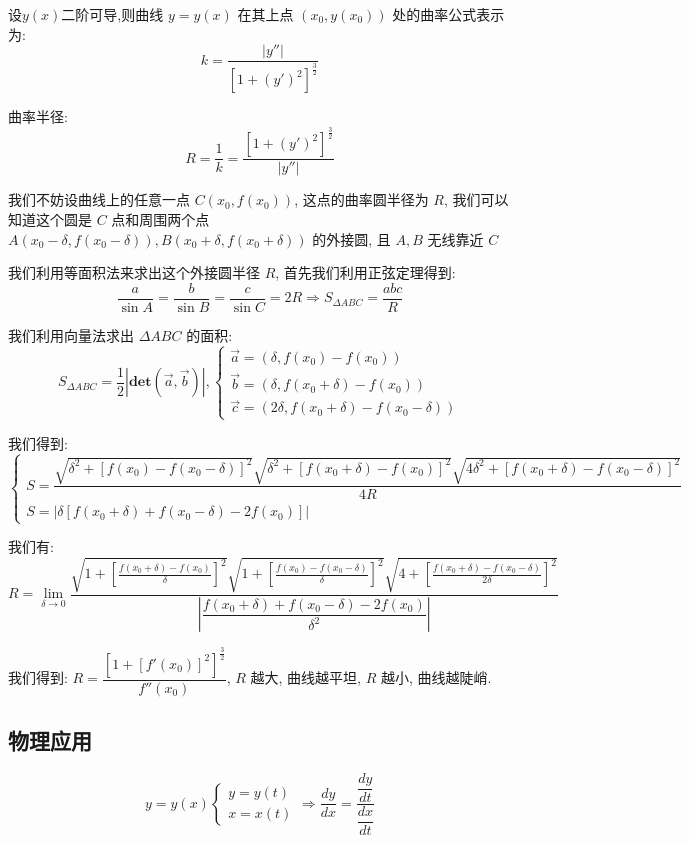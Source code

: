 \begin{definition}[曲率和曲率半径]

	设$y(x)$二阶可导,则曲线 $y=y(x)$ 在其上点 $(x_{0},y(x_{0}))$ 处的曲率公式表示为:
	$$k=\frac{|y''|}{[1+(y')^{2}]^{\frac{3}{2}}}$$

	曲率半径:
	$$R=\frac{1}{k}=\frac{[1+(y')^{2}]^{\frac{3}{2}}}{|y''|}$$
\end{definition}
\begin{anymark}[曲率半径推导]
	我们不妨设曲线上的任意一点 $C(x_{0},f(x_{0}))$, 这点的曲率圆半径为 $R$, 我们可以知道这个圆是 $C$ 点和周围两个点 $A(x_{0}-\delta,f(x_{0}-\delta)),B(x_{0}+\delta,f(x_{0}+\delta))$ 的外接圆, 且 $A,B$ 无线靠近 $C$

	我们利用等面积法来求出这个外接圆半径 $R$, 首先我们利用正弦定理得到:
	$$\dfrac{a}{\sin A} = \dfrac{b}{\sin B} = \dfrac{c}{\sin C} = 2R\Rightarrow S_{\Delta ABC} = \dfrac{abc}{R}$$

	我们利用向量法求出 $\Delta ABC$ 的面积:
	$$S_{\Delta ABC} = \dfrac{1}{2}|\mathbf{det}(\vec{a},\vec{b})| ,\begin{cases} \vec{a} = (\delta, f(x_{0})-f(x_{0}))\\ \vec{b} = (\delta,f(x_{0}+\delta)-f(x_{0})) \\ \vec{c}= (2\delta,f(x_{0}+\delta)-f(x_{0}-\delta))\end{cases} $$

	我们得到:
	$$\begin{cases} S = \dfrac{\sqrt{\delta^{2}+\left[f(x_{0})-f(x_{0}-\delta)\right]^{2}}\sqrt{\delta^{2}+\left[f(x_{0}+\delta)-f(x_{0})\right]^{2}}\sqrt{4\delta^{2}+\left[f(x_{0}+\delta)-f(x_{0}-\delta)\right]^{2}}}{4R} \\ S = |\delta\left[f(x_{0}+\delta)+f(x_{0}-\delta)-2f(x_{0})\right]|\end{cases}$$

	我们有:
	$$ R = \lim\limits_{\delta\to 0}\dfrac{\sqrt{1+\left[\frac{f(x_{0}+\delta)-f(x_{0})}{\delta}\right]^{2}}\sqrt{1+\left[\frac{f(x_{0})-f(x_{0}-\delta)}{\delta}\right]^{2}}\sqrt{4+\left[\frac{f(x_{0}+\delta)-f(x_{0}-\delta)}{2\delta}\right]^{2}}}{|\dfrac{f(x_{0}+\delta)+f(x_{0}-\delta)-2f(x_{0})}{\delta^{2}}|}$$

	我们得到: $R = \dfrac{\left[1 + [f'(x_{0})]^{2}\right]^{\frac{3}{2}}}{f''(x_{0})}$, $R$ 越大, 曲线越平坦, $R$ 越小, 曲线越陡峭.
\end{anymark}
\subsection{物理应用}
\begin{definition}[相关变化率]
	$$y=y(x)
		\left\lbrace
		\begin{array}{l}
			y=y(t) \\
			x=x(t)
		\end{array}
		\right.
		\Rightarrow
		\dfrac{dy}{dx}=\dfrac{\dfrac{dy}{dt}}{\dfrac{dx}{dt}} $$
\end{definition}

